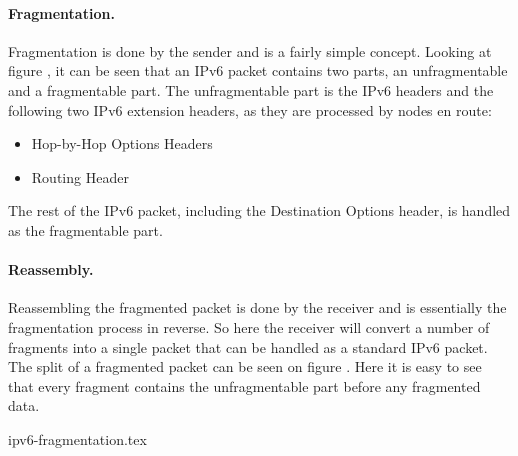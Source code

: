 \documentclass{report}
\begin{document}
\paragraph{Fragmentation.} Fragmentation is done by the sender and is a fairly simple concept. Looking at figure , it can be seen that an IPv6 packet contains two parts, an unfragmentable and a fragmentable part. The unfragmentable part is the IPv6 headers and the following two IPv6 extension headers, as they are processed by nodes en route:

\begin{itemize}
    \item Hop-by-Hop Options Headers
    \item Routing Header
\end{itemize}

The rest of the IPv6 packet, including the Destination Options header, is handled as the fragmentable part.

\paragraph{Reassembly.} Reassembling the fragmented packet is done by the receiver and is essentially the fragmentation process in reverse. So here the receiver will convert a number of fragments into a single packet that can be handled as a standard IPv6 packet. The split of a fragmented packet can be seen on figure . Here it is easy to see that every fragment contains the unfragmentable part before any fragmented data.

{ipv6-fragmentation.tex}
\end{document}
